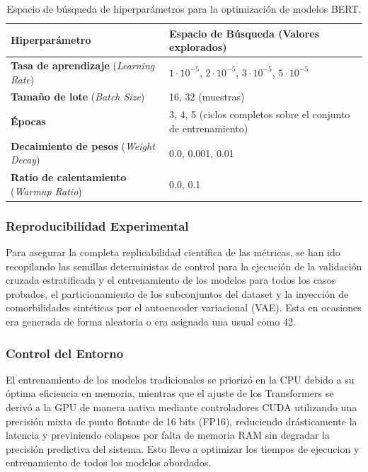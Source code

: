 \documentclass[12pt,a4paper,onecolumn,oneside]{report}
\begin{document}
\begin{table}[htbp]
\centering
\small
\renewcommand{\arraystretch}{1.3}
\begin{tabular}{|p{5.5cm}|p{8.5cm}|}
\hline
\rowcolor[RGB]{239,239,239} 
\textbf{Hiperparámetro} & \textbf{Espacio de Búsqueda (Valores explorados)} \\ \hline
\textbf{Tasa de aprendizaje} (\textit{Learning Rate}) & $1 \cdot 10^{-5}$, $2 \cdot 10^{-5}$, $3 \cdot 10^{-5}$, $5 \cdot 10^{-5}$ \\ \hline
\textbf{Tamaño de lote} (\textit{Batch Size}) & 16, 32 (muestras) \\ \hline
\textbf{Épocas} & 3, 4, 5 (ciclos completos sobre el conjunto de entrenamiento) \\ \hline
\textbf{Decaimiento de pesos} (\textit{Weight Decay}) & 0.0, 0.001, 0.01 \\ \hline
\textbf{Ratio de calentamiento} (\textit{Warmup Ratio}) & 0.0, 0.1 \\ \hline
\end{tabular}
\caption{Espacio de búsqueda de hiperparámetros para la optimización de modelos BERT.}
\label{tab:parametros_bert}
\end{table}


\subsubsection{Reproducibilidad Experimental}

Para asegurar la completa replicabilidad científica de las métricas, se han ido recopilando las semillas deterministas de control para la ejecución de la validación cruzada estratificada y el entrenamiento de los modelos para todos los casos probados, el particionamiento de los subconjuntos del dataset y la inyección de comorbilidades sintéticas por el autoencoder variacional (VAE). Esta en ocasiones era generada de forma aleatoria o era asignada una usual como 42.

\subsubsection{Control del Entorno} 

El entrenamiento de los modelos tradicionales se priorizó en la CPU debido a su óptima eficiencia en memoria, mientras que el ajuste de los Transformers se derivó a la GPU de manera nativa mediante controladores CUDA utilizando una precisión mixta de punto flotante de 16 bits (FP16), reduciendo drásticamente la latencia y previniendo colapsos por falta de memoria RAM sin degradar la precisión predictiva del sistema. Esto llevo a optimizar los tiempos de ejecucion y entrenamiento de todos los modelos abordados.
\end{document}
